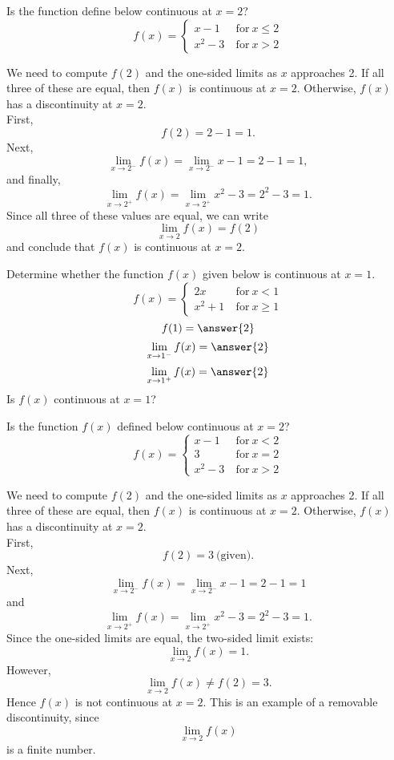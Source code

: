 \documentclass{ximera}
\begin{document}
\begin{example} %
Is the function define below continuous at $x = 2$?
\[f(x) = \left\{
     \begin{array}{lr}
       x-1 & \ \text{for} \  x \leq 2 \\
       x^2 - 3 & \ \text{for} \ x > 2
     \end{array}
   \right.
\]

We need to  compute $f(2)$ and the one-sided limits as $x$ approaches 2.
If all three of these are equal, then $f(x)$ is continuous at $x=2$.
Otherwise, $f(x)$ has a discontinuity at $x=2$.\\
First, 
\[
f(2) = 2-1 = 1.
\]
Next, 
\[
\lim_{x \to 2^-} f(x) = \lim_{x \to 2^-} x-1 = 2-1 = 1,
\]
and finally,
\[
\lim_{x \to 2^+} f(x) = \lim_{x \to 2^+} x^2 - 3 = 2^2 - 3 = 1.
\]
Since all three of these values are equal, we can write
\[
\lim_{x \to 2} f(x) = f(2)
\]
and conclude that $f(x)$ is continuous at $x = 2$.
\end{example}


\begin{problem} %
Determine whether the function $f(x)$ given below is continuous at $x = 1$.
\[
f(x) = \left\{
     \begin{array}{lr}
       2x & \ \text{for} \  x < 1 \\
       x^2 + 1 & \ \text{for} \ x \geq 1
     \end{array}
   \right.
\]
\[
f(1) = \answer{2}
\]
\[
\lim_{x \to 1^-} f(x) = \answer{2}
\]
\[
\lim_{x \to 1^+} f(x) = \answer{2}
\]
Is $f(x)$ continuous at $x = 1$?
\begin{multipleChoice}
\end{multipleChoice}
\end{problem}




\begin{example} %
Is the function $f(x)$ defined below continuous at $x = 2$?
\[
f(x) = \left\{
     \begin{array}{lr}
       x-1 & \ \text{for} \  x < 2 \\
			 3 & \ \text{for} \  x = 2 \\
       x^2 - 3 & \ \text{for} \ x > 2
     \end{array}
   \right.
\]


We need to  compute $f(2)$ and the one-sided limits as $x$ approaches 2.
If all three of these are equal, then $f(x)$ is continuous at $x=2$.
Otherwise, $f(x)$ has a discontinuity at $x=2$.\\
First, 
\[
f(2) = 3 \ \text{(given)}.
\]
Next, 
\[
\lim_{x \to 2^-} f(x) = \lim_{x \to 2^-} x-1 = 2-1 = 1
\]
and
\[
\lim_{x \to 2^+} f(x) = \lim_{x \to 2^+} x^2 - 3 = 2^2 - 3 = 1.
\]
Since the one-sided limits are equal, the two-sided limit exists:
\[
\lim_{x \to 2} f(x) = 1.
\]
However,
\[
\lim_{x \to 2} f(x) \neq f(2) = 3.
\]
Hence $f(x)$ is not continuous at $x = 2$.
This is an example of a removable discontinuity, since 
\[\lim_{x \to 2} f(x) \]
is a finite number.
\end{example}
\end{document}
